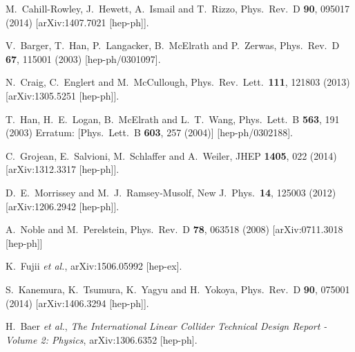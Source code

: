 \documentclass[12pt]{article}
\begin{document}
\begin{thebibliography}{99}
 M.~Cahill-Rowley, J.~Hewett, A.~Ismail and T.~Rizzo,
  Phys.\ Rev.\ D {\bf 90}, 095017 (2014)
  [arXiv:1407.7021 [hep-ph]].

 V.~Barger, T.~Han, P.~Langacker, B.~McElrath and P.~Zerwas,
  Phys.\ Rev.\ D {\bf 67}, 115001 (2003)
  [hep-ph/0301097].


  N.~Craig, C.~Englert and M.~McCullough,
  Phys.\ Rev.\ Lett.\  {\bf 111}, 121803 (2013)
  [arXiv:1305.5251 [hep-ph]].


 T.~Han, H.~E.~Logan, B.~McElrath and L.~T.~Wang,
  Phys.\ Lett.\ B {\bf 563}, 191 (2003)
  Erratum: [Phys.\ Lett.\ B {\bf 603}, 257 (2004)]
  [hep-ph/0302188].
 

 C.~Grojean, E.~Salvioni, M.~Schlaffer and A.~Weiler,
  JHEP {\bf 1405}, 022 (2014)
  [arXiv:1312.3317 [hep-ph]].

 D.~E.~Morrissey and M.~J.~Ramsey-Musolf,
  New J.\ Phys.\  {\bf 14}, 125003 (2012)
  [arXiv:1206.2942 [hep-ph]].

 A.~Noble and M.~Perelstein,
  Phys.\ Rev.\ D {\bf 78}, 063518 (2008)
  [arXiv:0711.3018 [hep-ph]]

 K.~Fujii {\it et al.},
  arXiv:1506.05992 [hep-ex].



 S.~Kanemura, K.~Tsumura, K.~Yagyu and H.~Yokoya,
  Phys.\ Rev.\ D {\bf 90}, 075001 (2014)
  [arXiv:1406.3294 [hep-ph]].


  H.~Baer {\it et al.},
{\it The International Linear Collider Technical Design Report - Volume 2: Physics},
  arXiv:1306.6352 [hep-ph].


\end{thebibliography}
\end{document}
